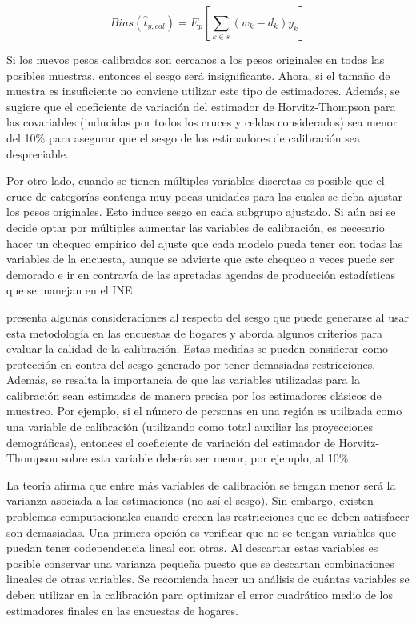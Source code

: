 \documentclass[
  10pt,
  spanish,
]{book}
\begin{document}
\[
Bias(\hat{t}_{y, cal}) = E_p \left[ \sum_{k \in s} (w_k - d_k) y_k \right]
\]

Si los nuevos pesos calibrados son cercanos a los pesos originales en todas las posibles muestras, entonces el sesgo será insignificante. Ahora, si el tamaño de muestra es insuficiente no conviene utilizar este tipo de estimadores. Además, se sugiere que el coeficiente de variación del estimador de Horvitz-Thompson para las covariables (inducidas por todos los cruces y celdas considerados) sea menor del 10\% para asegurar que el sesgo de los estimadores de calibración sea despreciable.

Por otro lado, cuando se tienen múltiples variables discretas es posible que el cruce de categorías contenga muy pocas unidades para las cuales se deba ajustar los pesos originales. Esto induce sesgo en cada subgrupo ajustado. Si aún así se decide optar por múltiples aumentar las variables de calibración, es necesario hacer un chequeo empírico del ajuste que cada modelo pueda tener con todas las variables de la encuesta, aunque se advierte que este chequeo a veces puede ser demorado e ir en contravía de las apretadas agendas de producción estadísticas que se manejan en el INE.

\citet{Silva_2004} presenta algunas consideraciones al respecto del sesgo que puede generarse al usar esta metodología en las encuestas de hogares y aborda algunos criterios para evaluar la calidad de la calibración. Estas medidas se pueden considerar como protección en contra del sesgo generado por tener demasiadas restricciones. Además, se resalta la importancia de que las variables utilizadas para la calibración sean estimadas de manera precisa por los estimadores clásicos de muestreo. Por ejemplo, si el número de personas en una región es utilizada como una variable de calibración (utilizando como total auxiliar las proyecciones demográficas), entonces el coeficiente de variación del estimador de Horvitz-Thompson sobre esta variable debería ser menor, por ejemplo, al 10\%.

La teoría afirma que entre más variables de calibración se tengan menor será la varianza asociada a las estimaciones (no así el sesgo). Sin embargo, existen problemas computacionales cuando crecen las restricciones que se deben satisfacer son demasiadas. Una primera opción es verificar que no se tengan variables que puedan tener codependencia lineal con otras. Al descartar estas variables es posible conservar una varianza pequeña puesto que se descartan combinaciones lineales de otras variables. Se recomienda hacer un análisis de cuántas variables se deben utilizar en la calibración para optimizar el error cuadrático medio de los estimadores finales en las encuestas de hogares.
\end{document}

